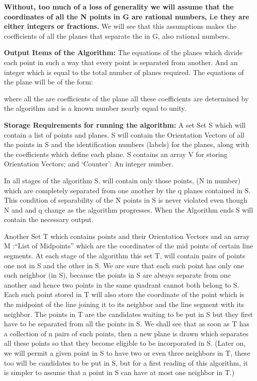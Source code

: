 \documentclass[english]{article}
\begin{document}
\textbf{Without, too much of a loss of generality we will assume that the coordinates of all the N points in G are rational numbers, i.e they are either integers or fractions.} We will see that this assumptions makes the coefficients of  all the  planes that separate the  in G, also rational numbers. 

\textbf{Output Items of the Algorithm:} The equations of the planes
which divide each point in such a way that every point is separated
from another. And an integer  which is equal to the
total number of planes required. The equations of the  plane will be of the form:

 where all the  are coefficients of the plane all these coefficients  are determined by the algorithm and   is a known number nearly equal to unity. 

\textbf{ Storage Requirements for running the algorithm:} A set Set
S which will contain a list of  points and  planes. S will contain the Orientation Vectors of all the points in S and the identification numbers (labels) for the planes, along with the coefficients which define each plane. S contains an array V for storing Orientation Vectors; and `Counter': An integer number. 

In all stages of the algorithm
S, will contain only those points, (N in number) which are completely
separated from one another by the q planes contained in S. This condition
of separability of the N points in S is never violated even though
N and and q change as the algorithm progresses. When the Algorithm
ends S will contain the necessary output.

Another Set T which contains points and their Orientation Vectors
and an array M :{}``List of Midpoints'' which are the coordinates
of the mid points of certain line segments. At each stage of the algorithm
this set T, will contain pairs of points one not in S and the other
in S. We are sure that each such point has only one such neighbor (in S),
because the points in S are always separate from one another and hence
two points in the same quadrant cannot both belong to S. Each such
point stored in T will also store the coordinate of the point which
is the midpoint of the line joining it to its neighbor and the line
segment with its neighbor. The points in T are the candidates waiting
to be put in S but they first have to be separated from all the points
in S. We shall see that as soon as T has a collection of n pairs of
such points, then a new plane is drawn which separates all these points
so that they become eligible to be incorporated in S. (Later on, we will permit a given point in S to have two or even three neighbors in T, these too will be candidates to be put in S, but for a first reading of this algorithm, it is simpler to assume that a point in S can have at most one neighbor in T.) 
\end{document}
